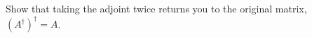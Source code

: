 \documentclass[12pt, oneside]{report}    %
\begin{document}
\begin{exercise}
Show that taking the adjoint twice returns you to the original matrix, $(A^\dag)^\dag = A$.
\end{exercise}


\end{document}
